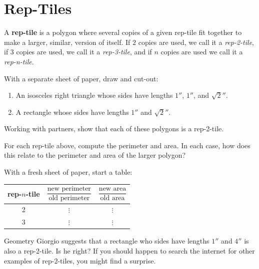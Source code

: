 \newpage
\section{Rep-Tiles}

A \textbf{rep-tile} is a polygon where several copies of
a given rep-tile fit together to make a larger, similar, version of
itself. If $2$ copies are used, we call it a \textit{rep-2-tile}, if
$3$ copies are used, we call it a \textit{rep-3-tile}, and if $n$ copies
are used we call it a \textit{rep-n-tile}.


\begin{prob}
With a separate sheet of paper, draw and cut-out:
\begin{enumerate}
\item An isosceles right triangle whose sides have lengths $1''$, $1''$, and $\sqrt{2}''$.
\item A rectangle whose sides have lengths $1''$ and $\sqrt{2}''$.
\end{enumerate}
Working with partners, show that each of these polygons is a rep-2-tile.
\end{prob}

\begin{prob}
For each rep-tile above, compute the perimeter and area. In each case,
how does this relate to the perimeter and area of the larger polygon?
\end{prob}


\begin{prob}
With a fresh sheet of paper, start a table:
\begin{center}
\begin{tabular}{c|c|c}
rep-$n$-tile & $\dfrac{\text{new perimeter}}{\text{old perimeter}}$ & $\dfrac{\text{new area}}{\text{old area}}$  \\
\hline\hline
 2 & $\vdots$  &  $\vdots$  \\ 
3 & $\vdots$  &  $\vdots$  \\ 
\end{tabular}
\end{center}
\end{prob}


\begin{prob}
Geometry Giorgio suggests that a rectangle who sides have lengths
$1''$ and $4''$ is also a rep-2-tile. Is he right? If you should
happen to search the internet for other examples of rep-2-tiles, you
might find a surprise.
\end{prob}


